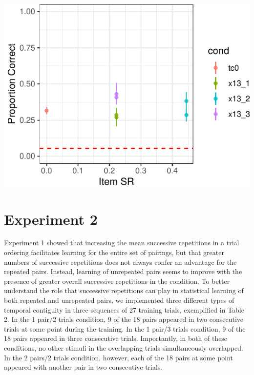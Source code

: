\documentclass[man,floatsintext]{apa6}
\begin{document}
\includegraphics{figs/exp2-1.pdf}

\hypertarget{experiment-2}{%
\section{Experiment 2}\label{experiment-2}}

Experiment 1 showed that increasing the mean successive repetitions in a trial ordering facilitates learning for the entire set of pairings, but that greater numbers of successive repetitions does not always confer an advantage for the repeated pairs. Instead, learning of unrepeated pairs seems to improve with the presence of greater overall successive repetitions in the condition. To better understand the role that successive repetitions can play in statistical learning of both repeated and unrepeated pairs, we implemented three different types of temporal contiguity in three sequences of 27 training trials, exemplified in Table 2. In the 1 pair/2 trials condition, 9 of the 18 pairs appeared in two consecutive trials at some point during the training. In the 1 pair/3 trials condition, 9 of the 18 pairs appeared in three consecutive trials. Importantly, in both of these conditions, no other stimuli in the overlapping trials simultaneously overlapped. In the 2 pairs/2 trials condition, however, each of the 18 pairs at some point appeared with another pair in two consecutive trials.
\end{document}
